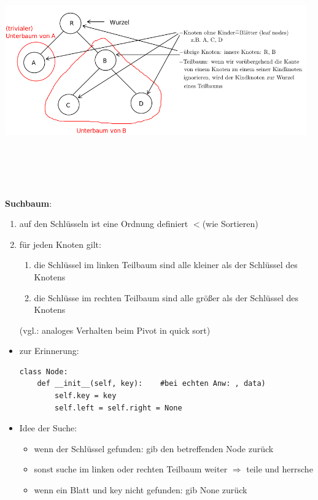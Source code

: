 \documentclass[11pt, fleqn]{scrreprt}
\begin{document}
\includegraphics[width=13cm,height=10cm,keepaspectratio]{./Pictures/binaerBaum2.png}

\textbf{Suchbaum}:
\begin{enumerate}
    \item auf den Schlüsseln ist eine Ordnung definiert \glqq $<$\grqq (wie Sortieren)
    \item für jeden Knoten gilt:
    \begin{enumerate}[label=\alph*)]
        \item die Schlüssel im linken Teilbaum sind alle kleiner als der Schlüssel des Knotens
        \item die Schlüsse im rechten Teilbaum sind alle größer als der Schlüssel des Knotens
    \end{enumerate}
    (vgl.: analoges Verhalten beim Pivot in quick sort)
\end{enumerate}
\begin{itemize}
    \item zur Erinnerung: \\
    \begin{verbatim}
class Node:
    def __init__(self, key):    #bei echten Anw: , data)
        self.key = key
        self.left = self.right = None
    \end{verbatim}
    \item Idee der Suche:
    \begin{itemize}
        \item wenn der Schlüssel gefunden: gib den betreffenden Node zurück
        \item sonst suche im linken oder rechten Teilbaum weiter $\Rightarrow$ \glqq teile und herrsche\grqq
        \item wenn ein Blatt und key nicht gefunden: gib None zurück
    \end{itemize}
\end{itemize}
\end{document}
